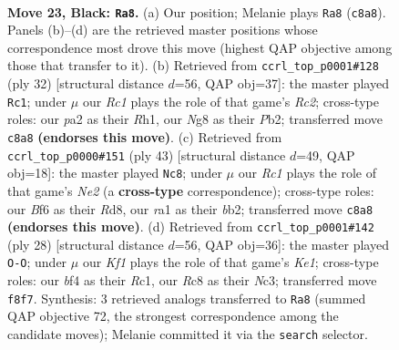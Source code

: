 \documentclass[11pt]{article}
\begin{document}
\clearpage

\begin{figure}[p]\centering
\begin{subfigure}{0.46\textwidth}\centering
\resizebox{\linewidth}{!}{%
\newchessgame
\chessboard[
  setfen={2r2knr/p5pp/2p2b2/5B2/5B2/5P1P/PPP3P1/R2R2K1 b - - 0 23},
  showmover=false,
  pgfstyle=straightmove, color=movearrow, markmove={c8-a8}
]}
\caption{}
\end{subfigure}\hfill
\begin{subfigure}{0.46\textwidth}\centering
\resizebox{\linewidth}{!}{%
\newchessgame
\chessboard[
  setfen={r4rk1/pp3p2/5p1p/4pb2/2B5/4P3/PPR2PPP/4K2R w K - 1 17},
  showmover=false,
  pgfstyle=straightmove, color=movearrow, markmove={c2-c1}
]}
\caption{}
\end{subfigure}
\\[4pt]
\begin{subfigure}{0.46\textwidth}\centering
\resizebox{\linewidth}{!}{%
\newchessgame
\chessboard[
  setfen={3r1k2/pp2n3/1b5r/3P1p1p/1PB1pP2/P7/1B4PP/1K1R3R b - - 3 22},
  showmover=false,
  pgfstyle=straightmove, color=movearrow, markmove={e7-c8}
]}
\caption{}
\end{subfigure}\hfill
\begin{subfigure}{0.46\textwidth}\centering
\resizebox{\linewidth}{!}{%
\newchessgame
\chessboard[
  setfen={r4rk1/pb2pp1p/6p1/1B2b3/8/2N1P3/PP3PPP/2R1K2R w K - 0 15},
  showmover=false,
  pgfstyle=straightmove, color=movearrow, markmove={e1-g1}
]}
\caption{}
\end{subfigure}
\caption{\textbf{Move 23, Black: \texttt{Ra8}.} (a) Our position; Melanie plays \texttt{Ra8} (\texttt{c8a8}). Panels (b)--(d) are the retrieved master positions whose correspondence most drove this move (highest QAP objective among those that transfer to it). (b) Retrieved from \texttt{ccrl\_top\_p0001\#128} (ply 32) [structural distance $d$=56, QAP obj=37]: the master played \texttt{Rc1}; under $\mu$ our \emph{Rc1} plays the role of that game's \emph{Rc2}; cross-type roles: our \emph{p}a2 as their \emph{R}h1, our \emph{N}g8 as their \emph{P}b2; transferred move \texttt{c8a8} \textbf{(endorses this move)}. (c) Retrieved from \texttt{ccrl\_top\_p0000\#151} (ply 43) [structural distance $d$=49, QAP obj=18]: the master played \texttt{Nc8}; under $\mu$ our \emph{Rc1} plays the role of that game's \emph{Ne2} (a \textbf{cross-type} correspondence); cross-type roles: our \emph{B}f6 as their \emph{R}d8, our \emph{r}a1 as their \emph{b}b2; transferred move \texttt{c8a8} \textbf{(endorses this move)}. (d) Retrieved from \texttt{ccrl\_top\_p0001\#142} (ply 28) [structural distance $d$=56, QAP obj=36]: the master played \texttt{O-O}; under $\mu$ our \emph{Kf1} plays the role of that game's \emph{Ke1}; cross-type roles: our \emph{b}f4 as their \emph{R}c1, our \emph{R}c8 as their \emph{N}c3; transferred move \texttt{f8f7}. Synthesis: 3 retrieved analogs transferred to \texttt{Ra8} (summed QAP objective 72, the strongest correspondence among the candidate moves); Melanie committed it via the \texttt{search} selector.}
\label{fig:thought-m45}
\end{figure}
\end{document}
